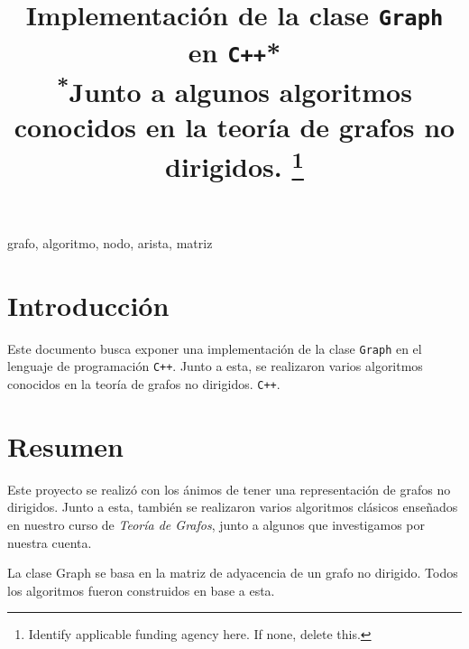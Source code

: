 \documentclass[conference]{IEEEtran}
\begin{document}
\title{Implementación de la clase \texttt{Graph} en \texttt{C++}*\\
{\footnotesize \textsuperscript{*}Junto a algunos algoritmos conocidos en la teoría de grafos no dirigidos.}
\thanks{Identify applicable funding agency here. If none, delete this.}
}

\author{
\and
{}
}


\maketitle

\begin{IEEEkeywords}
grafo, algoritmo, nodo, arista, matriz
\end{IEEEkeywords}

\section{Introducción}
Este documento busca exponer una implementación de la clase \texttt{Graph} en el lenguaje de programación \texttt{C++}. Junto a esta, se realizaron varios algoritmos conocidos en la teoría de grafos no dirigidos. \texttt{C++}.

\section{Resumen}

Este proyecto se realizó con los ánimos de tener una representación de grafos no dirigidos. Junto a esta, también se realizaron varios algoritmos clásicos enseñados en nuestro curso de \textit{Teoría de Grafos}, junto a algunos que investigamos por nuestra cuenta. 

La clase Graph se basa en la matriz de adyacencia de un grafo no dirigido. Todos los algoritmos fueron construidos en base a esta.
\end{document}
